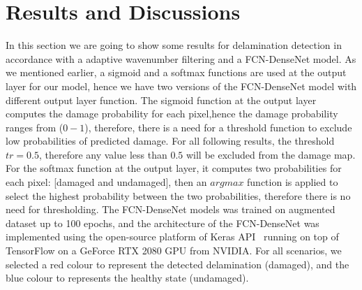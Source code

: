 \section{Results and Discussions}
	In this section we are going to show some results for delamination detection in accordance with a adaptive wavenumber filtering and a FCN-DenseNet model. 
	As we mentioned earlier, a sigmoid and a softmax functions are used at the output layer for our model, hence we have two versions of the FCN-DenseNet model with different output layer function.
	The sigmoid function at the output layer computes the damage probability for each pixel,hence the damage probability ranges from (\(0 - 1\)), therefore, there is a need for a threshold function to exclude low probabilities of predicted damage. 
	For all following results, the threshold \(tr = 0.5\), therefore any value less than \(0.5\) will be excluded from the damage map.
	For the softmax function at the output layer, it computes two probabilities for each pixel: [damaged and undamaged], then an \(argmax\) function is applied to select the highest probability between the two probabilities, therefore there is no need for thresholding. 
	The FCN-DenseNet models was trained on augmented dataset up to 100 epochs, and the architecture of the FCN-DenseNet  was implemented using the open-source platform of Keras API~\cite{chollet2015keras} running on top of TensorFlow on a GeForce RTX 2080  GPU from NVIDIA.
	For all scenarios, we selected a red colour to represent the detected delamination (damaged), and the blue colour to represents the healthy state (undamaged).
	
